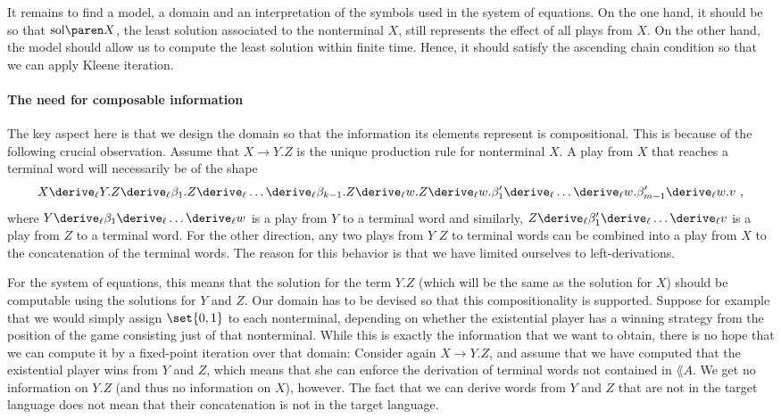 \documentclass[../../diss.tex]{subfiles}
\begin{document}
It remains to find a model, \ie a domain and an interpretation of the symbols used in the system of equations.
On the one hand, it should be so that $\sol{X}$, the least solution associated to the nonterminal $X$, still represents the effect of all plays from $X$.
On the other hand, the model should allow us to compute the least solution within finite time.
Hence, it should satisfy the ascending chain condition so that we can apply Kleene iteration.



\paragraph{The need for composable information}

The key aspect here is that we design the domain so that the information its elements represent is compositional.
This is because of the following crucial observation.
Assume that $X \to Y.Z$ is the unique production rule for nonterminal $X$.
A play from $X$ that reaches a terminal word will necessarily be of the shape
\[
    X
    \leftderive Y.Z
    \leftderive \beta_1.Z
    \leftderive \ldots
    \leftderive \beta_{k-1}.Z
    \leftderive w.Z
    \leftderive w.\beta_1'
    \leftderive \ldots
    \leftderive w.\beta_{m-1}'
    \leftderive w.v
    \ ,
\]
where $Y \leftderive \beta_1 \leftderive \ldots \leftderive w$ is a play from $Y$ to a terminal word and similarly, $Z \leftderive \beta_1' \leftderive \ldots \leftderive v$ is a play from $Z$ to a terminal word.
For the other direction, any two plays from $Y$ \resp $Z$ to terminal words can be combined into a play from $X$ to the concatenation of the terminal words.
The reason for this behavior is that we have limited ourselves to left-derivations.

For the system of equations, this means that the solution for the term $Y.Z$ (which will be the same as the solution for $X$) should be computable using the solutions for $Y$ and $Z$.
Our domain has to be devised so that this compositionality is supported.
Suppose for example that we would simply assign $\set{0,1}$ to each nonterminal, depending on whether the existential player has a winning strategy from the position of the game consisting just of that nonterminal.
While this is exactly the information that we want to obtain, there is no hope that we can compute it by a fixed-point iteration over that domain:
Consider again $X \to Y.Z$, and assume that we have computed that the existential player wins from $Y$ and $Z$, which means that she can enforce the derivation of terminal words not contained in $\lang{A}$.
We get no information on $Y.Z$ (and thus no information on $X$), however.
The fact that we can derive words from $Y$ and $Z$ that are not in the target language does not mean that their concatenation is not in the target language.
\end{document}
